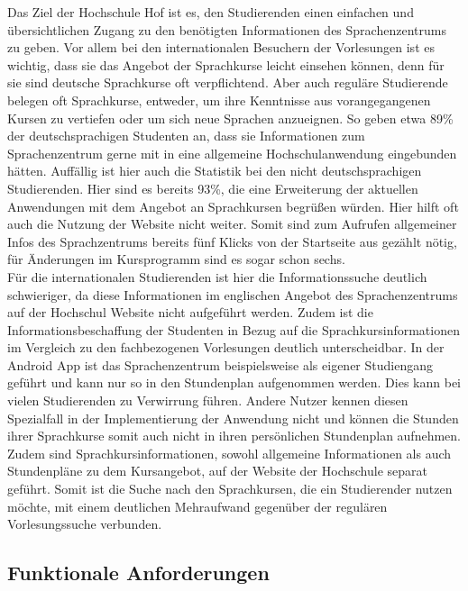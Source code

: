 Das Ziel der Hochschule Hof ist es, den Studierenden einen einfachen und übersichtlichen Zugang zu den benötigten Informationen des Sprachenzentrums zu geben. Vor allem bei den internationalen Besuchern der Vorlesungen ist es wichtig, dass sie das Angebot der Sprachkurse leicht einsehen können, denn für sie sind deutsche Sprachkurse oft verpflichtend. Aber auch reguläre Studierende belegen oft Sprachkurse, entweder, um ihre Kenntnisse aus vorangegangenen Kursen zu vertiefen oder um sich neue Sprachen anzueignen. So geben etwa 89\% der deutschsprachigen Studenten an, dass sie Informationen zum Sprachenzentrum gerne mit in eine allgemeine Hochschulanwendung eingebunden hätten. Auffällig ist hier auch die Statistik bei den nicht deutschsprachigen Studierenden. Hier sind es bereits 93\%, die eine Erweiterung der aktuellen Anwendungen mit dem Angebot an Sprachkursen begrüßen würden. Hier hilft oft auch die Nutzung der Website nicht weiter. Somit sind zum Aufrufen allgemeiner Infos des Sprachzentrums bereits fünf Klicks von der Startseite aus gezählt nötig, für Änderungen im Kursprogramm sind es sogar schon sechs\autocite[][]{umfrage}.
\\
\linebreak
Für die internationalen Studierenden ist hier die Informationssuche deutlich schwieriger, da diese Informationen im englischen Angebot des Sprachenzentrums auf der Hochschul Website nicht aufgeführt werden. Zudem ist die Informationsbeschaffung der Studenten in Bezug auf die Sprachkursinformationen im Vergleich zu den fachbezogenen Vorlesungen deutlich unterscheidbar. In der Android \ac{App} ist das Sprachenzentrum beispielsweise als eigener Studiengang geführt und kann nur so in den Stundenplan aufgenommen werden. Dies kann bei vielen Studierenden zu Verwirrung führen. Andere Nutzer kennen diesen Spezialfall in der Implementierung der Anwendung nicht und können die Stunden ihrer Sprachkurse somit auch nicht in ihren persönlichen Stundenplan aufnehmen. Zudem sind Sprachkursinformationen, sowohl allgemeine Informationen als auch Stundenpläne zu dem Kursangebot, auf der Website der Hochschule separat geführt. Somit ist die Suche nach den Sprachkursen, die ein Studierender nutzen möchte, mit einem deutlichen Mehraufwand gegenüber der regulären Vorlesungssuche verbunden. 

\subsection{Funktionale Anforderungen\label{sec:anf_sz}}

